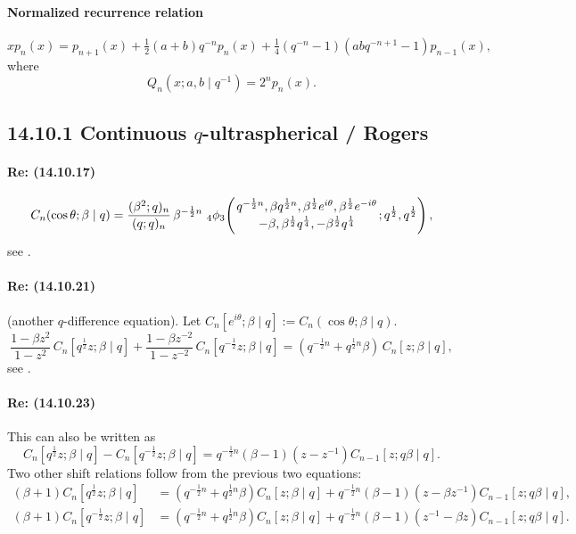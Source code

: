 \documentclass[twoside,11pt]{article}
\newcommand\be\beta
\newcommand\tha\theta
\newcommand\half{\frac12}
\newcommand\thalf{\tfrac12}
\newcommand{\qhyp}[5]{\,\mbox{}_{#1}\phi_{#2}\!\left(
  \genfrac{}{}{0pt}{}{#3}{#4};#5\right)}
\begin{document}
\paragraph{Normalized recurrence relation}
%
\begin{equation}
xp_n(x)=p_{n+1}(x)+\thalf(a+b)q^{-n} p_n(x)+
\tfrac14(q^{-n}-1)(abq^{-n+1}-1)p_{n-1}(x),
\label{22}
\end{equation}
%
where
\[
Q_n(x;a,b\mid q^{-1})=2^n p_n(x).
\]
%
\subsection*{14.10.1 Continuous $q$-ultraspherical / Rogers}
\paragraph{Re: (14.10.17)}
\begin{equation}
C_n(\cos\tha;\be\mid q)=
\frac{(\be^2;q)_n}{(q;q)_n}\,\be^{-\half n}\,
\qhyp43{q^{-\half n},\be q^{\half n},\be^\half e^{i\tha},\be^\half e^{-i\tha}}
{-\be,\be^\half q^{\frac14},-\be^\half q^{\frac14}}{q^\half,q^\half},
\label{23}
\end{equation}
see \cite[(7.4.13), (7.4.14)]{GR}.
%
\paragraph{Re: (14.10.21)}
(another $q$-difference equation).
Let $C_n[e^{i\tha};\be\mid q]:=C_n(\cos\tha;\be\mid q)$.
\begin{equation}
\frac{1-\be z^2}{1-z^2}\,C_n[q^\half z;\be\mid q]+
\frac{1-\be z^{-2}}{1-z^{-2}}\,C_n[q^{-\half}z;\be\mid q]=
(q^{-\half n}+q^{\half n} \be)\,C_n[z;\be\mid q],
\label{24}
\end{equation}
see \cite[(6.10)]{351}.
%
\paragraph{Re: (14.10.23)}
This can also be written as
\begin{equation}
C_n[q^\half z;\be\mid q]-C_n[q^{-\half}z;\be\mid q]=
q^{-\half n}(\be-1)(z-z^{-1})C_{n-1}[z;q\be\mid q].
\label{25}
\end{equation}
Two other shift relations follow from the previous two equations:
\begin{align}
(\be+1)C_n[q^\half z;\be\mid q]&=(q^{-\half n}+q^{\half n}\be)C_n[z;\be\mid q]
+q^{-\half n}(\be-1)(z-\be z^{-1})C_{n-1}[z;q\be\mid q],
\label{26}\\
(\be+1)C_n[q^{-\half}z;\be\mid q]&=(q^{-\half n}+q^{\half n}\be)C_n[z;\be\mid q]
+q^{-\half n}(\be-1)(z^{-1}-\be z)C_{n-1}[z;q\be\mid q].
\label{27}
\end{align}
%
\end{document}
